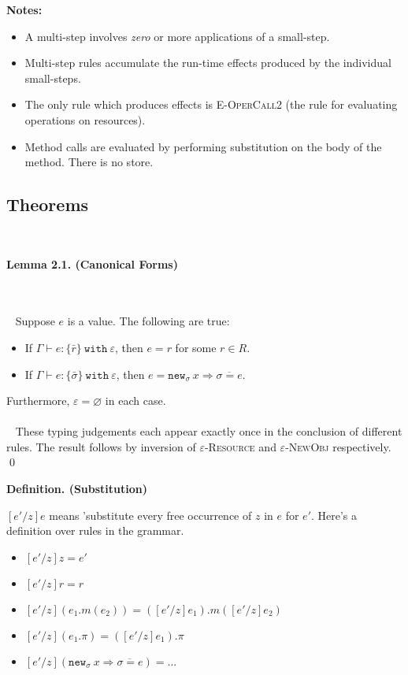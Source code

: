 \documentclass{llncs}
\newcommand{\keywadj}[1]{\mathtt{#1}}
\newcommand{\keyw}[1]{\keywadj{#1}~}
\newcommand{\thm}[3]{
	\begin{large}
		\bf{#1}
	\end{large} \\\\
	\fbox{Statement.} ~ #2
	\fbox{Proof.}~ #3 \qed
}
\newcommand{\type}[2]{
	#1~\keyw{with} #2
}
\newcommand{\newsig}[0]{
	\keywadj{new}_\sigma~x \Rightarrow \overline{\sigma = e}
}
\begin{document}
\noindent \textbf{Notes:}
\begin{itemize}
	\item A multi-step involves \textit{zero} or more applications of a small-step.
	\item Multi-step rules accumulate the run-time effects produced by the individual small-steps.
	\item The only rule which produces effects is \textsc{E-OperCall2} (the rule for evaluating operations on resources).
	\item Method calls are evaluated by performing substitution on the body of the method. There is no store.
\end{itemize}





\subsection{Theorems}


\ 
\thm{Lemma 2.1. (Canonical Forms)}
{Suppose $e$ is a value. The following are true:
	\begin{itemize}
	\item If $\Gamma \vdash e : \type{ \{ \bar r \} }{\varepsilon} $, then $e = r$ for some $r \in R$.
	\item If $\Gamma \vdash e : \type{ \{ \bar \sigma \}}{\varepsilon}$, then $e = \newsig$.
	\end{itemize}
Furthermore, $\varepsilon = \varnothing$ in each case. \\\\
}
{ These typing judgements each appear exactly once in the conclusion of different rules. The result follows by inversion of \textsc{$\varepsilon$-Resource} and \textsc{$\varepsilon$-NewObj} respectively. \\
}



\begin{large}
	\bf{Definition. (Substitution)}
\end{large}

$[e'/z]e$ means 'substitute every free occurrence of $z$ in $e$ for $e'$. Here's a definition over rules in the grammar.

\begin{itemize}
	\item $[e'/z]z = e'$
	\item $[e'/z]r = r$
	\item $[e'/z](e_1.m(e_2)) = ([e'/z]e_1).m([e'/z]e_2)$
	\item $[e'/z](e_1.\pi) = ([e'/z]e_1).\pi$
	\item $[e'/z](\keyw{new_\sigma} x \Rightarrow \overline {\sigma = e}) = ...$
\end{itemize}
\end{document}
